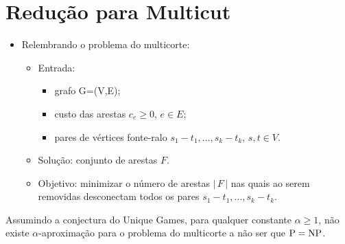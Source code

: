 \documentclass[12pt,a4paper]{article}
\begin{document}
\section{Redução para Multicut}

\begin{itemize}
    \item Relembrando o problema do multicorte:
        \begin{itemize}
            \item Entrada:
                \begin{itemize}
                    \item grafo G=(V,E);
                    \item custo das arestas $c_e \ge 0,\, e \in E$;
                    \item pares de vértices fonte-ralo $s_1-t_1, \dots, s_k-t_k,\,s,t \in V$.
                \end{itemize}
            \item Solução: conjunto de arestas $F$.
            \item Objetivo: minimizar o número de arestas $|\,F\,|$ nas quais ao serem removidas desconectam todos os pares $s_1-t_1, \dots, s_k-t_k$. 
        \end{itemize}
\end{itemize}        

\begin{teorema} \label{multicut}
    Assumindo a conjectura do Unique Games, para qualquer constante $\alpha \ge 1$, não existe $\alpha$-aproximação para o problema do multicorte a não ser que $\mathrm{P} = \mathrm{NP}$.
\end{teorema}
    
\end{document}
